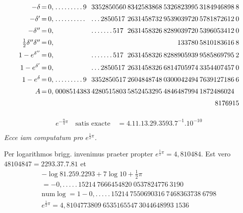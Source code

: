 \begingroup\footnotesize\setlength{\arraycolsep}{1pt}\renewcommand{\arraystretch}{1.12}\[
\begin{array}{r@{\,=\,}r@{\;}l@{\hspace{2pt}}l@{\hspace{2pt}}l@{\hspace{2pt}}l@{\hspace{2pt}}l@{\hspace{2pt}}l}
-\delta & 0{,} & .\,.\,.\,.\,.\,.\,.\,.\,.\,9 & 3352850560 & 8342583868 & 5326823995 & 3184946898 & 8\\[5pt]
-\delta' & 0{,} & .\,.\,.\,.\,.\,.\,.\,.\,.\,. & .\,.\,.\,2850517 & 2631458732 & 9539039720 & 5781872612 & 0\\[5pt]
-\delta'' & 0{,} &  & .\,.\,.\,.\,.\,.\,.\,517 & 2631458326 & 8289039720 & 5396053412 & 0\\[5pt]
\tfrac12\delta''\delta'' & 0{,} &  &  &  & \phantom{0000}133780 & 5810183616 & 8\\[5pt]
1-e^{\delta''} & 0{,} &  & .\,.\,.\,.\,.\,.\,.\,517 & 2631458326 & 8288905939 & 9585869795 & 2\\[5pt]
1-e^{\delta'} & 0{,} &  & .\,.\,.\,2850517 & 2631458326 & 6814705974 & 3354407457 & 0\\[5pt]
1-e^\delta & 0{,} & .\,.\,.\,.\,.\,.\,.\,.\,.\,9 & 3352850517 & 2604848748 & 0300042494 & 7639127186 & 6\\[5pt]
A & 0{,} & 0008514383 & 4280515803 & 5852453295 & 4846487994 & 1872486024 & \\[5pt]
\multicolumn{2}{c}{}&\multicolumn{6}{r}{8176915}\\[5pt]
\end{array}
\]\endgroup

\[
e^{-\frac94\pi}\quad\text{satis exacte}\quad=4.11.13.29.3593.7^{-1}.10^{-10}
\]

\begin{center}\emph{Ecce iam computatum pro $e^{\frac12\pi}$.}\end{center}

Per logarithmos brigg. invenimus praeter propter $e^{\frac12\pi}=4{,}810484$.
Est vero $48104847=2293.37.7.81$ et
\[
\begin{gathered}
-\log81.259.2293+7\log10+\tfrac12\pi\\[5pt]=-0{,}.\,.\,.\,.\,.\,15214\ 7666454820\ 0537824776\ 3190\\[5pt]
\mathrm{num}\log=1-0{,}.\,.\,.\,.\,.\,15214\ 7550690316\ 7468363738\ 6798\\[5pt]
e^{\frac12\pi}=4{,}8104773809\ 6535165547\ 3044648993\ 1536
\end{gathered}
\]

